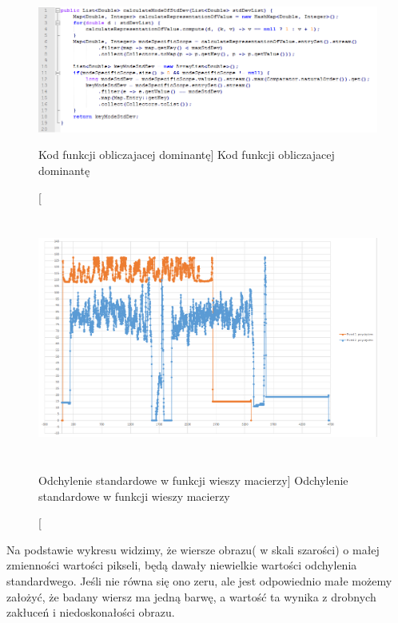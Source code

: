\documentclass[a4paper,12pt]{article}
\begin{document}
			    \guilsinglleft
			
			    \newpage
	        
	            \begin{figure}[!ht]  
		            \begin{center}
			            \includegraphics[width=17cm, frame] {image//algorithm//modeAlgorithm.png} 
		            \end{center}
			        \caption
    			        [Kod funkcji obliczajacej dominantę]
    			        {Kod funkcji obliczajacej dominantę}  
		        \end{figure}
			
    			\begin{figure}[!ht]  
    			    \begin{center}
    				    \includegraphics[width=17cm, height=8cm, frame] {image//practicalPart//stdDevCutBlackArea.png} 
    			    \end{center}
    			    \caption
            			[Odchylenie standardowe w funkcji wieszy macierzy] 
            			{Odchylenie standardowe w funkcji wieszy macierzy}  
    		    \end{figure}
			
    			Na podstawie wykresu widzimy, że wiersze obrazu( w skali szarości) o ma\l ej zmienności wartości pikseli, będą dawa\l y niewielkie wartości odchylenia standardwego. Jeśli nie równa się ono zeru, ale jest odpowiednio ma\l e możemy za\l ożyć, że badany wiersz ma jedną barwę, a wartość ta wynika z drobnych zak\l uceń i niedoskona\l ości obrazu.
    			
\end{document}
